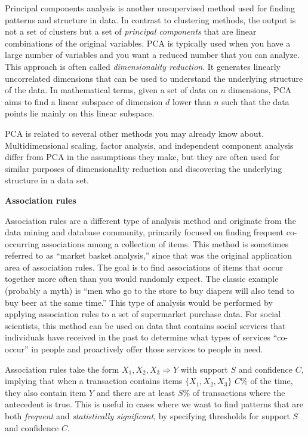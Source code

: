 \documentclass[]{krantz}
\begin{document}
Principal components analysis is another unsupervised method used for
finding patterns and structure in data. In contrast to clustering
methods, the output is not a set of clusters but a set of
\emph{principal components} that are linear combinations of the original
variables. PCA is typically used when you have a large number of
variables and you want a reduced number that you can analyze. This
approach is often called \emph{dimensionality reduction}. It generates
linearly uncorrelated dimensions that can be used to understand the
underlying structure of the data. In mathematical terms, given a set of
data on \(n\) dimensions, PCA aims to find a linear subspace of
dimension \(d\) lower than \(n\) such that the data points lie mainly on
this linear subspace.

PCA is related to several other methods you may already know about.
Multidimensional scaling, factor analysis, and independent component
analysis differ from PCA in the assumptions they make, but they are
often used for similar purposes of dimensionality reduction and
discovering the underlying structure in a data set.

\textbf{Association rules}

Association rules are a different type of analysis method and originate
from the data mining and database community, primarily focused on
finding frequent co-occurring associations among a collection of items.
This method is sometimes referred to as ``market basket analysis,''
since that was the original application area of association rules. The
goal is to find associations of items that occur together more often
than you would randomly expect. The classic example (probably a myth) is
``men who go to the store to buy diapers will also tend to buy beer at
the same time.'' This type of analysis would be performed by applying
association rules to a set of supermarket purchase data. For social
scientists, this method can be used on data that contains social
services that individuals have received in the past to determine what
types of services ``co-occur'' in people and proactively offer those
services to people in need.

Association rules take the form \(X_1, X_2, X_3 \Rightarrow Y\) with
support \(S\) and confidence \(C\), implying that when a transaction
contains items \(\{X_1, X_2, X_3\}\) \(C\)\% of the time, they also
contain item \(Y\) and there are at least \(S\)\% of transactions where
the antecedent is true. This is useful in cases where we want to find
patterns that are both \emph{frequent} and \emph{statistically
significant}, by specifying thresholds for support \(S\) and confidence
\(C\).
\end{document}
